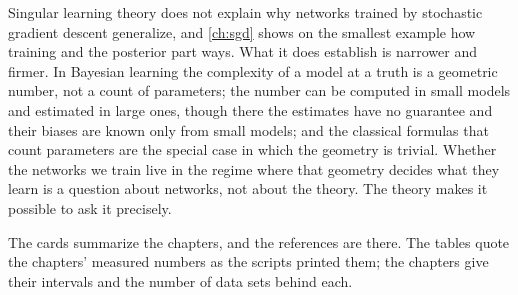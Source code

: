\begin{refsection}
Singular learning theory does not explain why networks trained by stochastic gradient descent generalize, and \cref{ch:sgd} shows on the smallest example how training and the posterior part ways. What it does establish is narrower and firmer. In Bayesian learning the complexity of a model at a truth is a geometric number, not a count of parameters; the number can be computed in small models and estimated in large ones, though there the estimates have no guarantee and their biases are known only from small models; and the classical formulas that count parameters are the special case in which the geometry is trivial. Whether the networks we train live in the regime where that geometry decides what they learn is a question about networks, not about the theory. The theory makes it possible to ask it precisely.

\notesandrefs

The cards summarize the chapters, and the references are there. The tables quote the chapters' measured numbers as the scripts printed them; the chapters give their intervals and the number of data sets behind each.

\printchapterbib
\end{refsection}
\sltfloatrestore
